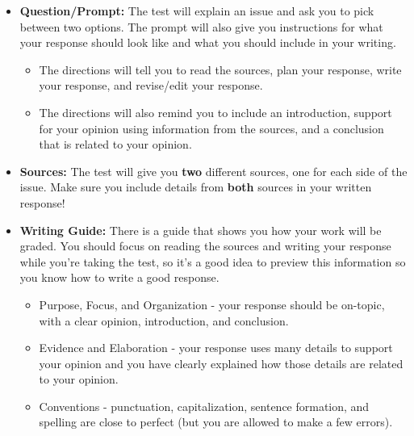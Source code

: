 \documentclass[12pt]{article}
\begin{document}
\vspace{1em}

\begin{tcolorbox}[colframe=black!60, colback=white, 
coltitle=black, colbacktitle=black!15, fonttitle=\bfseries\Large, 
title=What does the Writing Task Look Like?, halign title=center, left=10pt, right=10pt, top=10pt, bottom=15pt]

\begin{itemize}
    \item \textbf{Question/Prompt:} The test will explain an issue and ask you to pick between two options. The prompt will also give you instructions for what your response should look like and what you should include in your writing.
    \begin{itemize}
        \item The directions will tell you to read the sources, plan your response, write your response, and revise/edit your response.
        \item The directions will also remind you to include an introduction, support for your opinion using information from the sources, and a conclusion that is related to your opinion.
    \end{itemize}
    \item \textbf{Sources:} The test will give you \textbf{two} different sources, one for each side of the issue. Make sure you include details from \textbf{both} sources in your written response!
    \item \textbf{Writing Guide:} There is a guide that shows you how your work will be graded. You should focus on reading the sources and writing your response while you're taking the test, so it's a good idea to preview this information so you know how to write a good response.
    \begin{itemize}
        \item Purpose, Focus, and Organization - your response should be on-topic, with a clear opinion, introduction, and conclusion.
        \item Evidence and Elaboration - your response uses many details to support your opinion and you have clearly explained how those details are related to your opinion. 
        \item Conventions - punctuation, capitalization, sentence formation, and spelling are close to perfect (but you are allowed to make a few errors).
    \end{itemize}
    \end{itemize}






\end{tcolorbox}
\end{document}
